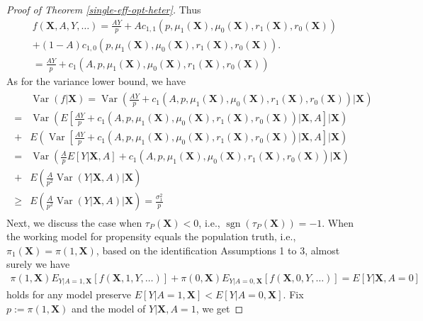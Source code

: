 \documentclass[11pt]{article}
\theoremstyle{referenceplain}
\theoremstyle{referencedefinition}
\theoremstyle{referenceremark}
\begin{document}
\begin{proof}[Proof of Theorem \ref{single-eff-opt-heter}]
Thus
\begin{align*}
    f(\mathbf{X},A,Y,\dots) = \frac{AY}{p} + A c_{1,1}(p,\mu_1(\mathbf{X}),\mu_0(\mathbf{X}),r_1(\mathbf{X}),r_0(\mathbf{X}))\\+ (1-A) c_{1,0}(p,\mu_1(\mathbf{X}),\mu_0(\mathbf{X}),r_1(\mathbf{X}),r_0(\mathbf{X})).\\
    =\frac{AY}{p} + c_1(A,p,\mu_1(\mathbf{X}),\mu_0(\mathbf{X}),r_1(\mathbf{X}),r_0(\mathbf{X}))
\end{align*}
As for the variance lower bound, we have
    \begin{align}\label{single-var-lb-tau+}
    \begin{aligned}
       & \operatorname{Var}(f|\mathbf{X})=\operatorname{Var}\left(\frac{AY}{p}+c_1(A,p,\mu_1(\mathbf{X}),\mu_0(\mathbf{X}),r_1(\mathbf{X}),r_0(\mathbf{X}))\bigg|\mathbf{X}\right)\\
        =&\operatorname{Var}\left(E\left[\frac{AY}{p}+c_1(A,p,\mu_1(\mathbf{X}),\mu_0(\mathbf{X}),r_1(\mathbf{X}),r_0(\mathbf{X}))\bigg|\mathbf{X},A\right]\bigg|\mathbf{X}\right)\\
        +&E\left(\operatorname{Var}\left[\frac{AY}{p}+c_1(A,p,\mu_1(\mathbf{X}),\mu_0(\mathbf{X}),r_1(\mathbf{X}),r_0(\mathbf{X}))\bigg|\mathbf{X},A\right]\bigg|\mathbf{X}\right)\\
        =&\operatorname{Var}\left(\frac{A}{p}E[Y|\mathbf{X},A]+c_1(A,p,\mu_1(\mathbf{X}),\mu_0(\mathbf{X}),r_1(\mathbf{X}),r_0(\mathbf{X}))\bigg|\mathbf{X}\right)\\
        +& E\left(\frac{A}{p^2}\operatorname{Var}(Y|\mathbf{X},A)\bigg|\mathbf{X}\right)\\
        \ge &  E\left(\frac{A}{p^2}\operatorname{Var}(Y|\mathbf{X},A)\bigg|\mathbf{X}\right) = \frac{\sigma_1^2}{p}
        \end{aligned}
    \end{align}
 Next, we discuss the case when $\tau_P(\mathbf{X})<0$, i.e., $\operatorname{sgn}\left(\tau_P\left(\mathbf{X}\right)\right)=-1$. When the working model for propensity equals the population truth, i.e., $\pi_1(\mathbf{X}) = \pi(1,\mathbf{X})$, based on the identification Assumptions 1 to 3, almost surely we have
\begin{align}\label{single-unbias-eq-tau<0}
   \pi(1,\mathbf{X})E_{Y|A=1,\mathbf{X}}[ f(\mathbf{X},1,Y,\dots)] + \pi(0,\mathbf{X}) E_{Y|A=0,\mathbf{X}}[ f(\mathbf{X},0,Y,\dots)] = E[Y|\mathbf{X},A=0]
\end{align}
holds for any model preserve $E[Y|A=1,\mathbf{X}] < E[Y|A=0,\mathbf{X}]$. Fix $p:= \pi(1,\mathbf{X})$ and the model of $Y|\mathbf{X},A=1$, we get

\end{proof}
\end{document}
